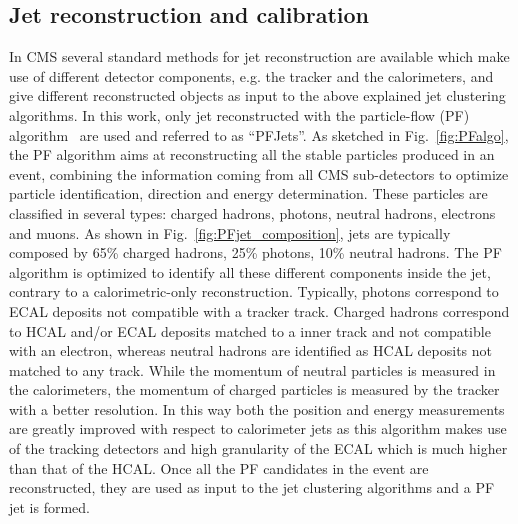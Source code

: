\subsection{Jet reconstruction and calibration}\label{subsec:jetsreco} %

In CMS several standard methods for jet reconstruction are available which make use of different detector components, e.g. the tracker and the calorimeters, and give different reconstructed objects as input to the above explained jet clustering algorithms. In this work, only jet reconstructed with the particle-flow (PF) algorithm~\cite{CMS-PAS-PFT-10-001,CMS-PAS-PFT-09-001} are used and referred to as ``PFJets''.
As sketched in Fig.~\ref{fig:PFalgo}, the PF algorithm aims at reconstructing all the stable particles produced in an event, combining the information coming from all CMS sub-detectors to optimize particle identification, direction and energy determination. These particles are classified in several types: charged hadrons, photons, neutral hadrons, electrons and muons. As shown in Fig.~\ref{fig:PFjet_composition}, jets are typically composed by 65\% charged hadrons, 25\% photons, 10\% neutral hadrons. The PF algorithm is optimized to identify all these different components inside the jet, contrary to a calorimetric-only reconstruction. Typically, photons correspond to ECAL deposits not compatible with a tracker track. Charged hadrons correspond to HCAL and/or ECAL deposits matched to a inner track and not compatible with an electron, whereas neutral hadrons are identified as HCAL deposits not matched to any track.
While the momentum of neutral particles is measured in the calorimeters, the momentum of charged particles is measured by the tracker with a better resolution. In this way both the position and energy measurements are greatly improved with respect to calorimeter jets as this algorithm makes use of the tracking detectors and high granularity of the ECAL which is much higher than that of the HCAL.
Once all the PF candidates in the event are reconstructed, they are used as input to the jet clustering algorithms and a PF jet is formed.

